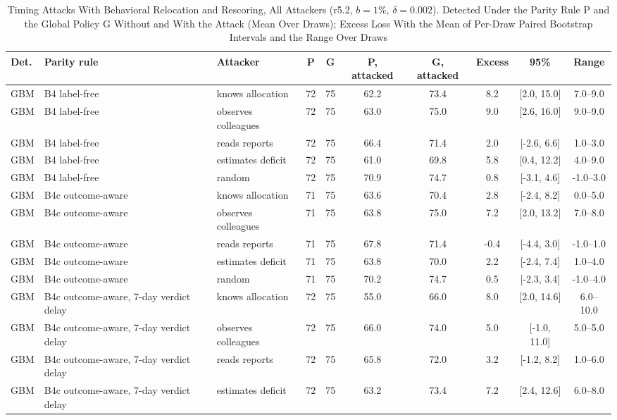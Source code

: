 \begin{table}[!t]
\caption{Timing Attacks With Behavioral Relocation and Rescoring, All Attackers (r5.2, $b=1\%$, $\delta=0.002$). Detected Under the Parity Rule P and the Global Policy G Without and With the Attack (Mean Over Draws); Excess Loss With the Mean of Per-Draw Paired Bootstrap Intervals and the Range Over Draws\label{tab:e-l1-r52}}
\centering
\scriptsize
\setlength{\tabcolsep}{3pt}
\begin{tabular}{lllccccccc}
\toprule
Det. & Parity rule & Attacker & P & G & P, attacked & G, attacked & Excess & 95\% & Range \\
\midrule
GBM & B4 label-free & knows allocation & 72 & 75 & 62.2 & 73.4 & 8.2 & [2.0, 15.0] & 7.0--9.0 \\
GBM & B4 label-free & observes colleagues & 72 & 75 & 63.0 & 75.0 & 9.0 & [2.6, 16.0] & 9.0--9.0 \\
GBM & B4 label-free & reads reports & 72 & 75 & 66.4 & 71.4 & 2.0 & [-2.6, 6.6] & 1.0--3.0 \\
GBM & B4 label-free & estimates deficit & 72 & 75 & 61.0 & 69.8 & 5.8 & [0.4, 12.2] & 4.0--9.0 \\
GBM & B4 label-free & random & 72 & 75 & 70.9 & 74.7 & 0.8 & [-3.1, 4.6] & -1.0--3.0 \\
GBM & B4c outcome-aware & knows allocation & 71 & 75 & 63.6 & 70.4 & 2.8 & [-2.4, 8.2] & 0.0--5.0 \\
GBM & B4c outcome-aware & observes colleagues & 71 & 75 & 63.8 & 75.0 & 7.2 & [2.0, 13.2] & 7.0--8.0 \\
GBM & B4c outcome-aware & reads reports & 71 & 75 & 67.8 & 71.4 & -0.4 & [-4.4, 3.0] & -1.0--1.0 \\
GBM & B4c outcome-aware & estimates deficit & 71 & 75 & 63.8 & 70.0 & 2.2 & [-2.4, 7.4] & 1.0--4.0 \\
GBM & B4c outcome-aware & random & 71 & 75 & 70.2 & 74.7 & 0.5 & [-2.3, 3.4] & -1.0--4.0 \\
GBM & B4c outcome-aware, 7-day verdict delay & knows allocation & 72 & 75 & 55.0 & 66.0 & 8.0 & [2.0, 14.6] & 6.0--10.0 \\
GBM & B4c outcome-aware, 7-day verdict delay & observes colleagues & 72 & 75 & 66.0 & 74.0 & 5.0 & [-1.0, 11.0] & 5.0--5.0 \\
GBM & B4c outcome-aware, 7-day verdict delay & reads reports & 72 & 75 & 65.8 & 72.0 & 3.2 & [-1.2, 8.2] & 1.0--6.0 \\
GBM & B4c outcome-aware, 7-day verdict delay & estimates deficit & 72 & 75 & 63.2 & 73.4 & 7.2 & [2.4, 12.6] & 6.0--8.0 \\

\end{tabular}
\end{table}
